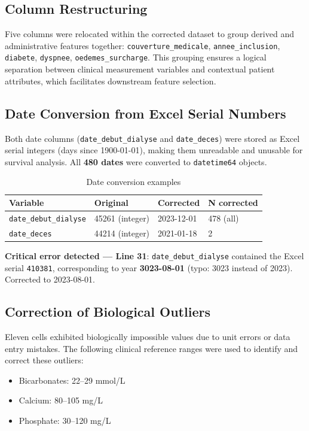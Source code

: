 \documentclass[12pt,a4paper,twoside]{report}
\begin{document}
\subsection{Column Restructuring}

Five columns were relocated within the corrected dataset to group derived and administrative features together: \texttt{couverture\_medicale}, \texttt{annee\_inclusion}, \texttt{diabete}, \texttt{dyspnee}, \texttt{oedemes\_surcharge}. This grouping ensures a logical separation between clinical measurement variables and contextual patient attributes, which facilitates downstream feature selection.

\subsection{Date Conversion from Excel Serial Numbers}

Both date columns (\texttt{date\_debut\_dialyse} and \texttt{date\_deces}) were stored as Excel serial integers (days since 1900-01-01), making them unreadable and unusable for survival analysis. All \textbf{480 dates} were converted to \texttt{datetime64} objects.

\begin{table}[htbp]
\centering
\caption{Date conversion examples}
\label{tab:date_conversion}
\begin{tabular}{llll}
\toprule
\textbf{Variable} & \textbf{Original} & \textbf{Corrected} & \textbf{N corrected} \\
\midrule
\texttt{date\_debut\_dialyse} & 45261 (integer) & 2023-12-01 & 478 (all) \\
\texttt{date\_deces} & 44214 (integer) & 2021-01-18 & 2 \\
\bottomrule
\end{tabular}
\end{table}

\begin{notebox}
\textbf{Critical error detected — Line 31}: \texttt{date\_debut\_dialyse} contained the Excel serial \texttt{410381}, corresponding to year \textbf{3023-08-01} (typo: 3023 instead of 2023). Corrected to 2023-08-01.
\end{notebox}

\subsection{Correction of Biological Outliers}

Eleven cells exhibited biologically impossible values due to unit errors or data entry mistakes. The following clinical reference ranges were used to identify and correct these outliers:
\begin{itemize}
  \item Bicarbonates: 22--29 mmol/L \cite{kdigo2015}
  \item Calcium: 80--105 mg/L \cite{kdigo_mineral_2017}
  \item Phosphate: 30--120 mg/L
\end{itemize}
\end{document}

